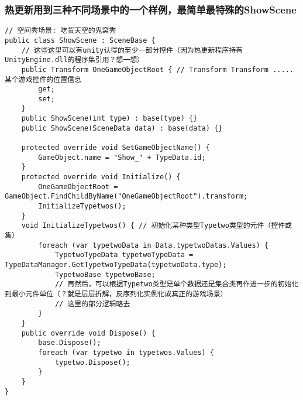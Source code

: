 \documentclass[9pt, b5paper]{article}
\begin{document}
\subsubsection{热更新用到三种不同场景中的一个样例，最简单最特殊的ShowScene}
\label{sec-1-3-2}
\begin{verbatim}
// 空间秀场景: 吃货天空的鬼窝秀
public class ShowScene : SceneBase {
    // 这些这里可以有unity认得的至少一部分控件（因为热更新程序持有UnityEngine.dll的程序集引用？想一想）
    public Transform OneGameObjectRoot { // Transform Transform ..... 某个游戏控件的位置信息
        get;
        set;
    }
    public ShowScene(int type) : base(type) {}
    public ShowScene(SceneData data) : base(data) {}

    protected override void SetGameObjectName() {
        GameObject.name = "Show_" + TypeData.id;
    }
    protected override void Initialize() {
        OneGameObjectRoot = GameObject.FindChildByName("OneGameObjectRoot").transform;
        InitializeTypetwos();
    }
    void InitializeTypetwos() { // 初始化某种类型Typetwo类型的元件（控件或集）
        foreach (var typetwoData in Data.typetwoDatas.Values) {
            TypetwoTypeData typetwoTypeData = TypeDataManager.GetTypetwoTypeData(typetwoData.type);
            TypetwoBase typetwoBase;
            // 再然后，可以根据Typetwo类型是单个数据还是集合类再作进一步的初始化到最小元件单位（？就是层层折解，反序列化实例化成真正的游戏场景）
            // 这里的部分逻辑略去
        }
    }
    public override void Dispose() {
        base.Dispose();
        foreach (var typetwo in typetwos.Values) {
            typetwo.Dispose();
        }
    }
}
\end{verbatim}
\end{document}
